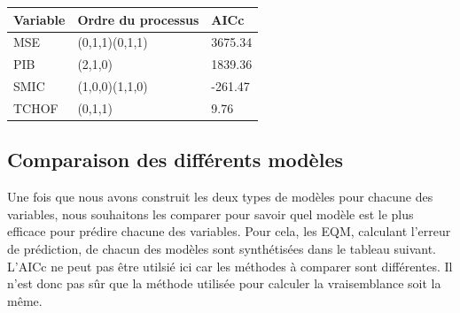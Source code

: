 \documentclass[11pt,]{article}
\begin{document}
\begin{longtable}[]{@{}lll@{}}
\toprule
Variable & Ordre du processus & AICc\tabularnewline
\midrule
\endhead
MSE & (0,1,1)(0,1,1) & 3675.34\tabularnewline
PIB & (2,1,0) & 1839.36\tabularnewline
SMIC & (1,0,0)(1,1,0) & -261.47\tabularnewline
TCHOF & (0,1,1) & 9.76\tabularnewline
\bottomrule
\end{longtable}

\subsection{Comparaison des différents
modèles}\label{comparaison-des-differents-modeles-1}

Une fois que nous avons construit les deux types de modèles pour chacune
des variables, nous souhaitons les comparer pour savoir quel modèle est
le plus efficace pour prédire chacune des variables. Pour cela, les EQM,
calculant l'erreur de prédiction, de chacun des modèles sont
synthétisées dans le tableau suivant. L'AICc ne peut pas être utilsié
ici car les méthodes à comparer sont différentes. Il n'est donc pas sûr
que la méthode utilisée pour calculer la vraisemblance soit la même.
\end{document}

